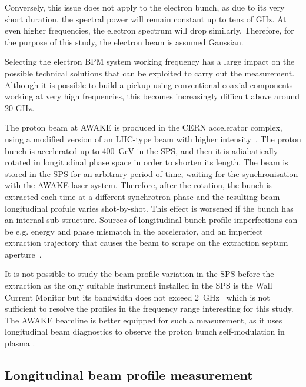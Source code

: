Conversely, this issue does not apply to the electron bunch, as due to its very short duration, the spectral power will remain constant up to tens of GHz. At even higher frequencies, the electron spectrum will drop similarly. Therefore, for the purpose of this study, the electron beam is assumed Gaussian. 

Selecting the electron BPM system working frequency has a large impact on the possible technical solutions that can be exploited to carry out the measurement. Although it is possible to build a pickup using conventional coaxial components working at very high frequencies, this becomes increasingly difficult above around 20 GHz.

The proton beam at AWAKE is produced  in the CERN accelerator complex, using a modified version of an LHC-type beam with higher intensity~\cite{Papaphilippou:2031187, Timko:1595512}. The proton bunch is accelerated up to 400~GeV in the SPS, and then it is adiabatically rotated in  longitudinal phase space in order to shorten its length. The beam is stored in the SPS for an arbitrary period of time, waiting for the synchronisation with the AWAKE laser system. Therefore, after the rotation, the bunch is extracted each time at a different synchrotron phase and the resulting beam longitudinal profule varies shot-by-shot. This effect is worsened if the bunch has an internal sub-structure. Sources of longitudinal bunch profile imperfections can be e.g. energy and phase mismatch in the accelerator, and an imperfect extraction trajectory that causes the beam to scrape on the extraction septum aperture~\cite{handbook_acc_phys}.

It is not possible to study the beam profile variation in the SPS before the extraction as the only suitable instrument installed in the SPS is the Wall Current Monitor \cite{Papotti:private-comm} but its bandwidth does not exceed 2~GHz~\cite{Bohl:1164165} which is not sufficient to resolve the profiles in the frequency range interesting for this study. The AWAKE beamline is better equipped for such a measurement, as it uses longitudinal beam diagnostics to observe the proton bunch self-modulation in plasma \cite{PhysRevLett.122.054802}.




\subsection[Longitudinal beam profile measurement]{Longitudinal beam profile measurement} \label{sec:p_temporal_profile}

